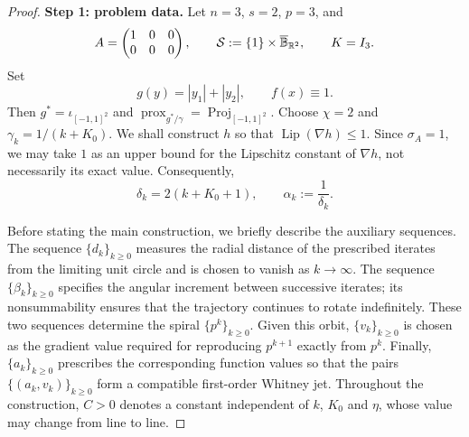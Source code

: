\documentclass[11pt]{article}
\numberwithin{equation}{section}
\newcommand{\R}{\mathbb{R}}
\newcommand{\prox}{\operatorname{prox}}
\newcommand{\Proj}{\operatorname{Proj}}
\begin{document}
\begin{proof}
\textbf{Step 1: problem data.}
Let $n=3$, $s=2$, $p=3$, and
\[
A=\begin{pmatrix}1&0&0\\0&0&0\end{pmatrix},\qquad
{\cal S}:=\{1\}\times \overline{\mathbb B}_{\R^2},\qquad K=I_3.
\]
Set
\[
g(y)=|y_1|+|y_2|,\qquad f(x)\equiv1.
\]
Then \(g^*=\iota_{[-1,1]^2}\) and
$
\prox_{g^*/\gamma}=\Proj_{[-1,1]^2}.$
Choose \(\chi=2\) and \(\gamma_k=1/(k+K_0)\). We shall construct \(h\) so that
\(\operatorname{Lip}(\nabla h)\le 1\). Since \(\sigma_A=1\), we may take \(1\)
as an upper bound for the Lipschitz constant of \(\nabla h\),
 not necessarily its
exact value. Consequently,
\[
\delta_k=2(k+K_0+1),
\qquad
\alpha_k:=\frac{1}{\delta_k}.
\]


Before stating the main construction, we briefly describe the
auxiliary sequences. The sequence \(\{d_k\}_{k\ge 0}\) measures the radial
distance of the prescribed iterates from the limiting unit circle and is chosen
to vanish as \(k\to\infty\). The sequence \(\{\beta_k\}_{k\ge 0}\) specifies the angular
increment between successive iterates; its nonsummability ensures that the
trajectory continues to rotate indefinitely. These two sequences determine the spiral
\(\{p^k\}_{k\ge 0}\). Given this orbit, \(\{v_k\}_{k\ge 0}\) is chosen as the gradient value required
for  reproducing \(p^{k+1}\) exactly from
\(p^k\). Finally, \(\{a_k\}_{k\ge 0}\) prescribes the corresponding function values so that
the pairs \(\{(a_k,v_k)\}_{k\ge 0}\) form a compatible first-order Whitney jet.
Throughout the construction, $C>0$ denotes a constant independent of $k$, $K_0$ and $\eta$, whose value may change from line to line.



\end{proof}
\end{document}
